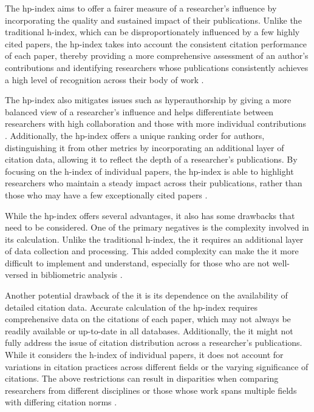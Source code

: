 The hp-index aims to offer a fairer measure of a researcher's influence by
incorporating the quality and sustained impact of their publications. Unlike
the traditional h-index, which can be disproportionately influenced by a few
highly cited papers, the hp-index takes into account the consistent citation
performance of each paper, thereby providing a more comprehensive assessment of
an author’s contributions and identifying researchers whose publications
consistently achieves a high level of recognition across their body of work
\cite{singhal2023hp,singhal2023analysis}.

The hp-index also mitigates issues such as hyperauthorship by giving a more
balanced view of a researcher's influence and helps differentiate between
researchers with high collaboration and those with more individual
contributions \cite{singhal2023hp,singhal2023analysis}. Additionally, the
hp-index offers a unique ranking order for authors, distinguishing it from
other metrics by incorporating an additional layer of citation data, allowing
it to reflect the depth of a researcher's publications. By focusing on the
h-index of individual papers, the hp-index is able to highlight researchers who
maintain a steady impact across their publications, rather than those who may
have a few exceptionally cited papers \cite{singhal2023hp,singhal2023analysis}.

While the hp-index offers several advantages, it also has some drawbacks that
need to be considered. One of the primary negatives is the complexity involved
in its calculation. Unlike the traditional h-index, the it requires an
additional layer of data collection and processing. This added complexity can
make the it more difficult to implement and understand, especially for those
who are not well-versed in bibliometric analysis \cite{singhal2023hp}.

Another potential drawback of the it is its dependence on the availability of
detailed citation data. Accurate calculation of the hp-index requires
comprehensive data on the citations of each paper, which may not always be
readily available or up-to-date in all databases. Additionally, the it might
not fully address the issue of citation distribution across a researcher's
publications. While it considers the h-index of individual papers, it does not
account for variations in citation practices across different fields or the
varying significance of citations. The above restrictions can result in
disparities when comparing researchers from different disciplines or those
whose work spans multiple fields with differing citation norms
\cite{singhal2023hp,singhal2023analysis}.

